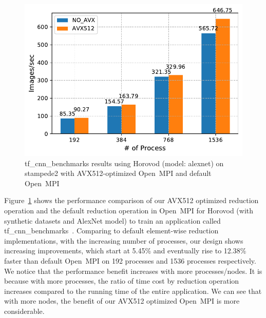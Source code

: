 \documentclass[sigconf]{acmart}
\newcommand{\ompi}[0]{Open~MPI\xspace}
\begin{document}
\begin{figure}[h]
    \centering
    \includegraphics[width=\linewidth]{horovod_tacc.pdf}
    \caption{tf\_cnn\_benchmarks results using Horovod (model: alexnet) on stampede2 
    with AVX512-optimized \ompi and default \ompi}
    \label{fig:horovod_tacc}
\end{figure}

Figure~\ref{fig:horovod_tacc} shows the performance comparison of
our AVX512 optimized reduction operation and the default reduction operation in \ompi for Horovod (with synthetic datasets and AlexNet model) to train an application called tf\_cnn\_benchmarks~\cite{cnn_Tensorflow}.
Comparing to default element-wise reduction
implementations, with the increasing number of processes,
our design shows increasing improvements, which start at 5.45\% and
eventually rise to 12.38\% faster than default \ompi on 192 processes and 1536 processes respectively.
We notice that the performance benefit increases with more processes/nodes. 
It is because with more processes, the ratio of time cost by reduction operation increases 
compared to the running time of the entire application. 
We can see that with more nodes, the benefit of our AVX512 optimized \ompi is more considerable.

\end{document}
